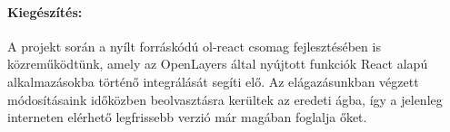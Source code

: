 \paragraph{Kiegészítés:}
A projekt során a nyílt forráskódú ol-react csomag fejlesztésében is
közreműködtünk, amely az OpenLayers által nyújtott funkciók React alapú
alkalmazásokba történő integrálását segíti elő. Az elágazásunkban végzett
módosításaink időközben beolvasztásra kerültek az eredeti ágba, így a jelenleg
interneten elérhető legfrissebb verzió már magában foglalja őket.
